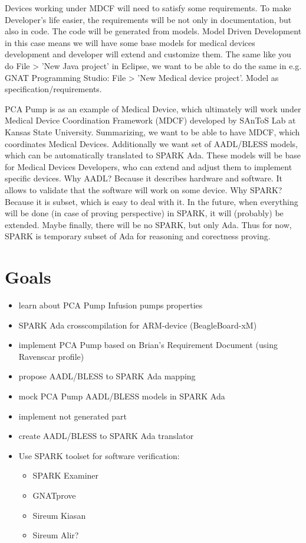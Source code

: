 Devices working under MDCF will need to satisfy some requirements. To make Developer's life easier, the requirements will be not only in documentation, but also in code. The code will be generated from models.
Model Driven Development in this case means we will have some base models for medical devices development and developer will extend and customize them. The same like you do File > 'New Java project' in Eclipse, we want to be able to do the same in e.g. GNAT Programming Studio: File > 'New Medical device project'.
Model as specification/requirements.

PCA Pump is as an example of Medical Device, which ultimately will work under Medical Device Coordination Framework (MDCF) developed by SAnToS Lab at Kansas State University.
Summarizing, we want to be able to have MDCF, which coordinates Medical Devices. Additionally we want set of AADL/BLESS models, which can be automatically translated to SPARK Ada. These models will be base for Medical Devices Developers, who can extend and adjust them to implement specific devices. 
Why AADL? Because it describes hardware and software. It allows to validate that the software will work on some device.
Why SPARK? Because it is subset, which is easy to deal with it. In the future, when everything will be done (in case of proving perspective) in SPARK, it will (probably) be extended. Maybe finally, there will be no SPARK, but only Ada. Thus for now, SPARK is temporary subset of Ada for reasoning and corectness proving.


\section{Goals}
\label{introduction:goals}
\begin{itemize}
	\item learn about PCA Pump Infusion pumps properties
	\item SPARK Ada crosscompilation for ARM-device (BeagleBoard-xM)
	\item implement PCA Pump based on Brian's Requirement Document (using Ravenscar profile)
	\item propose AADL/BLESS to SPARK Ada mapping
	\item mock PCA Pump AADL/BLESS models in SPARK Ada
	\item implement not generated part
	\item create AADL/BLESS to SPARK Ada translator
	\item Use SPARK toolset for software verification:
		\begin{itemize}
			\item SPARK Examiner
			\item GNATprove
			\item Sireum Kiasan
			\item Sireum Alir?
		\end{itemize}
\end{itemize}




